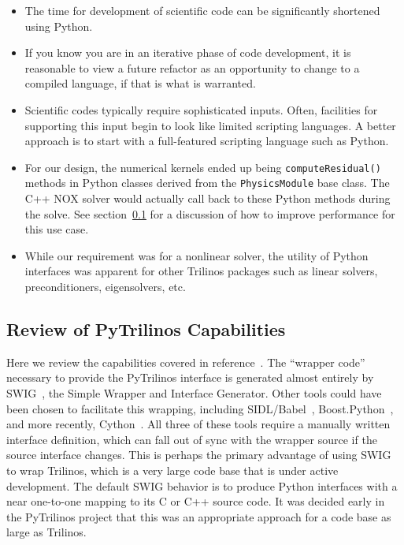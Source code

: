 \documentclass[11pt]{article}
\begin{document}
\begin{itemize}

\item The time for development of scientific code can be significantly shortened using Python.

\item If you know you are in an iterative phase of code development, it is reasonable to view a future refactor as an opportunity to change to a compiled language, if that is what is warranted.

\item Scientific codes typically require sophisticated inputs.  Often, facilities for supporting this input begin to look like limited scripting languages.  A better approach is to start with a full-featured scripting language such as Python.

\item For our design, the numerical kernels ended up being {\tt computeResidual()} methods in Python classes derived from the {\tt PhysicsModule} base class.  The C++ NOX solver would actually call back to these Python methods during the solve.  See section~\ref{sec:capabilities} for a discussion of how to improve performance for this use case.

\item While our requirement was for a nonlinear solver, the utility of Python interfaces was apparent for other Trilinos packages such as linear solvers, preconditioners, eigensolvers, etc.

\end{itemize}

\subsection{Review of PyTrilinos Capabilities}
\label{sec:capabilities}

Here we review the capabilities covered in reference~\cite{PyTrilinos}.  The ``wrapper code'' necessary to provide the PyTrilinos interface is generated almost entirely by SWIG~\cite{SWIG_CXX_Python}, the Simple Wrapper and Interface Generator.  Other tools could have been chosen to facilitate this wrapping, including SIDL/Babel~\cite{Babel}, Boost.Python~\cite{BoostPython}, and more recently, Cython~\cite{Cython}.  All three of these tools require a manually written interface definition, which can fall out of sync with the wrapper source if the source interface changes.  This is perhaps the primary advantage of using SWIG to wrap Trilinos, which is a very large code base that is under active development.  The default SWIG behavior is to produce Python interfaces with a near one-to-one mapping to its C or C++ source code.  It was decided early in the PyTrilinos project that this was an appropriate approach for a code base as large as Trilinos.
\end{document}
